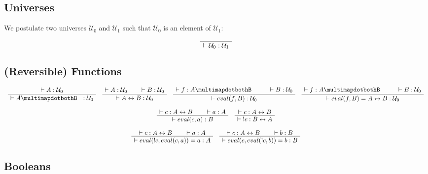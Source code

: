 \documentclass[format=acmlarge,review,natbib]{acmart}
\newcommand{\invc}[1]{!#1}
\newcommand{\evalone}[2]{eval(#1,#2)}
\newcommand{\iso}{\leftrightarrow}
\newcommand{\piso}{\multimapdotbothB~~}
\newcommand{\uzero}{\mathcal{U}_0}
\newcommand{\uone}{\mathcal{U}_1}
\newcommand{\proves}{\vdash}
\newcommand{\jdg}[2]{\proves #1 : #2}
\begin{document}
\newpage

\subsection{Universes}

We postulate two universes $\uzero$ and $\uone$ such that $\uzero$ is an element
of $\uone$:

\[
  \AxiomC{}
  \UnaryInfC{$\jdg{\uzero}{\uone}$}
  \DisplayProof
\]

\subsection{(Reversible) Functions}

\[
  \begin{array}{c}
    \AxiomC{$\jdg{A}{\uzero}$}
    \UnaryInfC{$\jdg{A\piso}{\uzero}$}
    \DisplayProof
    \quad
    \AxiomC{$\jdg{A}{\uzero}$}
    \AxiomC{$\jdg{B}{\uzero}$}
    \BinaryInfC{$\jdg{A\iso B}{\uzero}$}
    \DisplayProof
    \quad
    \AxiomC{$\jdg{f}{A \piso}$}
    \AxiomC{$\jdg{B}{\uzero}$}
    \BinaryInfC{$\jdg{\evalone{f}{B}}{\uzero}$}
    \DisplayProof
    \quad
    \AxiomC{$\jdg{f}{A \piso}$}
    \AxiomC{$\jdg{B}{\uzero}$}
    \BinaryInfC{$\jdg{\evalone{f}{B} = A \iso B}{\uzero}$}
    \DisplayProof
    \\
    \\
    \AxiomC{$\jdg{c}{A \iso B}$}
    \AxiomC{$\jdg{a}{A}$}
    \BinaryInfC{$\jdg{\evalone{c}{a}}{B}$}
    \DisplayProof
    \quad
    \AxiomC{$\jdg{c}{A \iso B}$}
    \UnaryInfC{$\jdg{\;\invc{c}}{B \iso A}$}
    \DisplayProof
    \\
    \\
    \AxiomC{$\jdg{c}{A \iso B}$}
    \AxiomC{$\jdg{a}{A}$}
    \BinaryInfC{$\jdg{\evalone{\invc{c}}{\evalone{c}{a}} = a}{A}$}
    \DisplayProof
    \quad
    \AxiomC{$\jdg{c}{A \iso B}$}
    \AxiomC{$\jdg{b}{B}$}
    \BinaryInfC{$\jdg{\evalone{c}{\evalone{\invc{c}}{b}} = b}{B}$}
    \DisplayProof
  \end{array}
\]

\subsection{Booleans}
\end{document}
